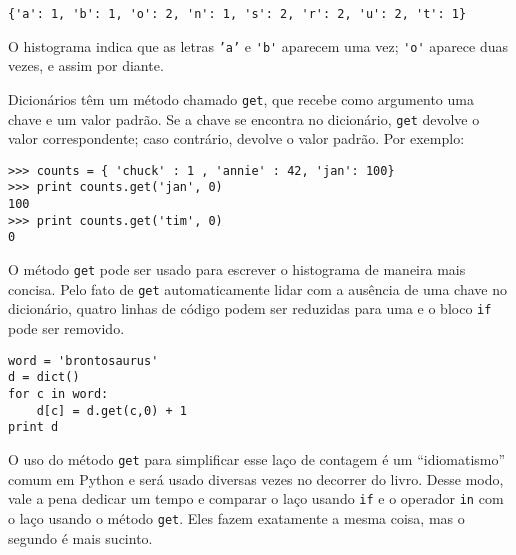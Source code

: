 \beforeverb
\begin{verbatim}
{'a': 1, 'b': 1, 'o': 2, 'n': 1, 's': 2, 'r': 2, 'u': 2, 't': 1}
\end{verbatim}
\afterverb
%

O histograma indica que as letras {\tt 'a'} e \verb"'b'" aparecem uma vez; \verb"'o'" aparece duas vezes, e assim por diante.


Dicionários têm um método chamado {\tt get}, que recebe como argumento uma chave e um valor padrão. Se a chave se encontra no dicionário, {\tt get} devolve o valor correspondente; caso contrário, devolve o valor padrão. Por exemplo:

\beforeverb
\begin{verbatim}
>>> counts = { 'chuck' : 1 , 'annie' : 42, 'jan': 100}
>>> print counts.get('jan', 0)
100
>>> print counts.get('tim', 0)
0
\end{verbatim}
\afterverb
%

O método {\tt get} pode ser usado para escrever o histograma de maneira mais concisa.
Pelo fato de {\tt get} automaticamente lidar com a ausência de uma chave no dicionário, quatro linhas de código podem ser reduzidas para uma e o bloco {\tt if} pode ser removido.

\beforeverb
\begin{verbatim}
word = 'brontosaurus'
d = dict()
for c in word:
    d[c] = d.get(c,0) + 1
print d
\end{verbatim}
\afterverb
%

O uso do método {\tt get} para simplificar esse laço de contagem é um ``idiomatismo'' comum em Python e será usado diversas vezes no decorrer do livro. Desse modo, vale a pena dedicar um tempo e comparar o laço usando {\tt if} e o operador {\tt in} com o laço usando o método {\tt get}. Eles fazem exatamente a mesma coisa, mas o segundo é mais sucinto.

